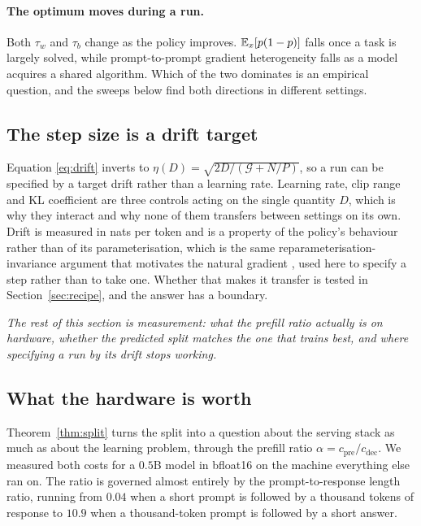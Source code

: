\paragraph{The optimum moves during a run.} Both $\tau_w$ and $\tau_b$ change as the policy
improves. $\mathbb{E}_x[p(1-p)]$ falls once a task is largely solved, while prompt-to-prompt gradient
heterogeneity falls as a model acquires a shared algorithm. Which of the two dominates is an
empirical question, and the sweeps below find both directions in different settings.

\subsection{The step size is a drift target}

Equation \eqref{eq:drift} inverts to $\eta(D) = \sqrt{2D/(\mathcal{G} + N/P)}$, so a run can be
specified by a target drift rather than a learning rate. Learning rate, clip range and KL
coefficient are three controls acting on the single quantity $D$, which is why they interact and why
none of them transfers between settings on its own. Drift is measured in nats per token and is a
property of the policy's behaviour rather than of its parameterisation, which is the same
reparameterisation-invariance argument that motivates the natural gradient
\citep{amari1998natural}, used here to specify a step rather than to take one. Whether that makes it
transfer is tested in Section~\ref{sec:recipe}, and the answer has a boundary.

\bigskip
\noindent\emph{The rest of this section is measurement: what the prefill ratio actually is on
hardware, whether the predicted split matches the one that trains best, and where specifying a run
by its drift stops working.}
\medskip

\subsection{What the hardware is worth}
\label{sec:hardware}

Theorem~\ref{thm:split} turns the split into a question about the serving stack as much as about
the learning problem, through the prefill ratio $\alpha = c_{\mathrm{pre}}/c_{\mathrm{dec}}$. We
measured both costs for a $0.5$B model in bfloat16 on the machine everything else ran on. The ratio
is governed almost entirely by the prompt-to-response length ratio, running from $0.04$ when a
short prompt is followed by a thousand tokens of response to $10.9$ when a thousand-token prompt is
followed by a short answer.

